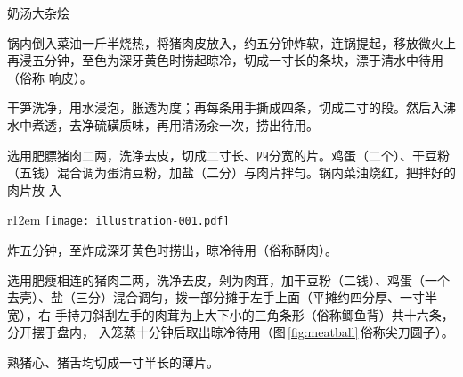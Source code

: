 \begin{recipe}{奶汤大杂烩}

\ingredients


\preparation

\step 锅内倒入菜油一斤半烧热，将猪肉皮放入，约五分钟炸软，连锅提起，移放微火上
再浸五分钟，至色为深牙黄色时捞起晾冷，切成一寸长的条块，漂于清水中待用（俗称
响皮）。

\step 干笋洗净，用水浸泡，胀透为度；再每条用手撕成四条，切成二寸的段。然后入沸
水中煮透，去净硫磺质味，再用清汤汆一次，捞出待用。

\step 选用肥膘猪肉二两，洗净去皮，切成二寸长、四分宽的片。鸡蛋（二个）、干豆粉
（五钱）混合调为蛋清豆粉，加盐（二分）与肉片拌匀。锅内菜油烧红，把拌好的肉片放
入
\begin{wrapfigure}[9]{r}{12em}%
\centering%
\vspace{.3125\baselineskip}%
\quad\texttt{[image: illustration-001.pdf]}%
\vspace{-.1875\baselineskip}%
\caption{尖刀圆子作法}
\label{fig:meatball}
\end{wrapfigure}%
%
炸五分钟，至炸成深牙黄色时捞出，晾冷待用（俗称酥肉）。

\step 选用肥瘦相连的猪肉二两，洗净去皮，剁为肉茸，加干豆粉（二钱）、鸡蛋（一个
去壳）、盐（三分）混合调匀，拨一部分摊于左手上面（平摊约四分厚、一寸半宽），右
手持刀斜刮左手的肉茸为上大下小的三角条形（俗称鲫鱼背）共十六条，分开摆于盘内，
入笼蒸十分钟后取出晾冷待用（图\,\ref{fig:meatball}\,俗称尖刀圆子）。

\step 熟猪心、猪舌均切成一寸半长的薄片。


\end{recipe}
